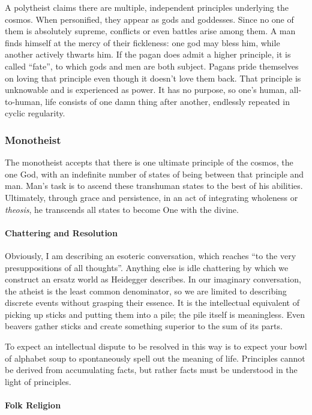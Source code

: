 A polytheist claims there are multiple, independent principles underlying the cosmos. When personified, they appear as gods and goddesses. Since no one of them is absolutely supreme, conflicts or even battles arise among them. A man finds himself at the mercy of their fickleness: one god may bless him, while another actively thwarts him. If the pagan does admit a higher principle, it is called ``fate'', to which gods and men are both subject. Pagans pride themselves on loving that principle even though it doesn't love them back. That principle is unknowable and is experienced as power. It has no purpose, so one's human, all-to-human, life consists of one damn thing after another, endlessly repeated in cyclic regularity.

\subsubsection{Monotheist}


The monotheist accepts that there is one ultimate principle of the cosmos, the one God, with an indefinite number of states of being between that principle and man. Man's task is to ascend these transhuman states to the best of his abilities. Ultimately, through grace and persistence, in an act of integrating wholeness or \emph{theosis}, he transcends all states to become One with the divine.

\paragraph{Chattering and Resolution}


Obviously, I am describing an esoteric conversation, which reaches ``to the very presuppositions of all thoughts''. Anything else is idle chattering by which we construct an ersatz world as Heidegger describes. In our imaginary conversation, the atheist is the least common denominator, so we are limited to describing discrete events without grasping their essence. It is the intellectual equivalent of picking up sticks and putting them into a pile; the pile itself is meaningless. Even beavers gather sticks and create something superior to the sum of its parts.

To expect an intellectual dispute to be resolved in this way is to expect your bowl of alphabet soup to spontaneously spell out the meaning of life. Principles cannot be derived from accumulating facts, but rather facts must be understood in the light of principles.

\paragraph{Folk Religion}



